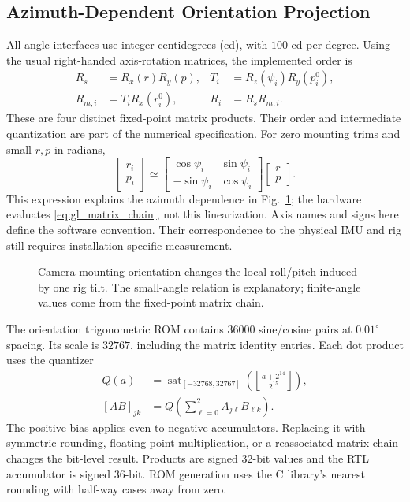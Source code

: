 \subsection{Azimuth-Dependent Orientation Projection}
All angle interfaces use integer centidegrees (cd), with $100$ cd per degree.
Using the usual right-handed axis-rotation matrices, the implemented order is
\begin{align}
 R_s &= R_x(r)R_y(p), & T_i &= R_z(\psi_i)R_y(p_i^0),\\
 R_{m,i} &= T_iR_x(r_i^0), & R_i &= R_sR_{m,i}.
 \label{eq:gl_matrix_chain}
\end{align}
These are four distinct fixed-point matrix products. Their order and
intermediate quantization are part of the numerical specification.
For zero mounting trims and small $r,p$ in radians,
\begin{equation}
 \begin{bmatrix}r_i\\p_i\end{bmatrix}
 \simeq
 \begin{bmatrix}\cos\psi_i&\sin\psi_i\\-\sin\psi_i&\cos\psi_i\end{bmatrix}
 \begin{bmatrix}r\\p\end{bmatrix}.
 \label{eq:gl_small_angle}
\end{equation}
This expression explains the azimuth dependence in
Fig.~\ref{fig:gl_projection}; the hardware evaluates
\eqref{eq:gl_matrix_chain}, not this linearization. Axis names and signs here
define the software convention. Their correspondence to the physical IMU
and rig still requires installation-specific measurement.

\begin{figure}[t]
\centering
\caption{Camera mounting orientation changes the local roll/pitch induced by
one rig tilt. The small-angle relation is explanatory; finite-angle values
come from the fixed-point matrix chain.}
\label{fig:gl_projection}
\end{figure}

The orientation trigonometric ROM contains $36000$ sine/cosine pairs at
$0.01^\circ$ spacing. Its scale is $32767$, including the matrix identity
entries. Each dot product uses the quantizer
\begin{equation}
 \begin{aligned}
 Q(a)&=\operatorname{sat}_{[-32768,32767]}
       \left(\left\lfloor\frac{a+2^{14}}{2^{15}}\right\rfloor\right),
 \\
 [AB]_{jk}&=Q\!\left(\sum_{\ell=0}^2 A_{j\ell}B_{\ell k}\right).
 \end{aligned}
 \label{eq:gl_mat_quant}
\end{equation}
The positive bias applies even to negative accumulators. Replacing it with
symmetric rounding, floating-point multiplication, or a reassociated matrix
chain changes the bit-level result. Products are signed 32-bit values and
the RTL accumulator is signed 36-bit. ROM generation uses the C library's
nearest rounding with half-way cases away from zero.


